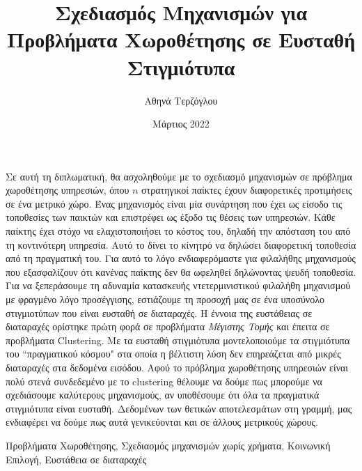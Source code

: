 \documentclass[diploma]{softlab-thesis}
\begin{document}
\frontmatter


\title{Σχεδιασμός Μηχανισμών για Προβλήματα
Χωροθέτησης σε Ευσταθή Στιγμιότυπα}
\author{Αθηνά Τερζόγλου}
\date{Μάρτιος 2022}




\maketitle



\begin{abstractgr}%
Σε αυτή τη διπλωματική, θα ασχοληθούμε με το σχεδιασμό μηχανισμών σε πρόβλημα χωροθέτησης υπηρεσιών, όπου $n$ στρατηγικοί παίκτες έχουν διαφορετικές προτιμήσεις σε ένα μετρικό χώρο. Ένας μηχανισμός είναι μία συνάρτηση που έχει ως είσοδο τις τοποθεσίες των παικτών και επιστρέφει ως έξοδο τις θέσεις των υπηρεσιών. Κάθε παίκτης έχει στόχο να ελαχιστοποιήσει το κόστος του, δηλαδή την απόσταση του από τη κοντινότερη υπηρεσία. Αυτό το δίνει το κίνητρό να δηλώσει διαφορετική τοποθεσία από τη πραγματική του. Για αυτό το λόγο ενδιαφερόμαστε για φιλαλήθης μηχανισμούς που εξασφαλίζουν ότι κανένας παίκτης δεν θα ωφεληθεί δηλώνοντας ψευδή τοποθεσία. Για να ξεπεράσουμε τη αδυναμία κατασκευής ντετερμινιστικού φιλαλήθη μηχανισμού με φραγμένο λόγο προσέγγισης, εστιάζουμε τη προσοχή μας σε ένα υποσύνολο στιγμιοτύπων που είναι ευσταθή σε διαταραχές. Η έννοια της ευστάθειας σε διαταραχές ορίστηκε πρώτη φορά σε προβλήματα \textit{Μέγιστης Τομής} και έπειτα σε προβλήματα Clustering. Με τα ευσταθή στιγμιότυπα μοντελοποιούμε τα στιγμιότυπα του ``πραγματικού κόσμου" στα οποία η βέλτιστη λύση δεν επηρεάζεται από μικρές διαταραχές στα  δεδομένα εισόδου. Αφού το πρόβλημα χωροθέτησης υπηρεσιών είναι πολύ στενά συνδεδεμένο με το clustering θέλουμε να δούμε πως μπορούμε να σχεδιάσουμε καλύτερους μηχανισμούς, αν υποθέσουμε ότι όλα τα πραγματικά στιγμιότυπα είναι ευσταθή. Δεδομένων των θετικών αποτελεσμάτων στη γραμμή, μας ενδιαφέρει να δούμε πως αυτά γενικεύονται και σε άλλους μετρικούς χώρους.
  
 
\begin{keywordsgr}
Προβλήματα Χωροθέτησης, Σχεδιασμός μηχανισμών χωρίς χρήματα, Κοινωνική Επιλογή, Ευστάθεια σε διαταραχές
\end{keywordsgr}
\end{abstractgr}
\end{document}
